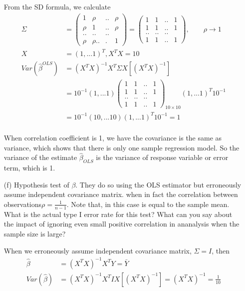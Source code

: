 \documentclass[11pt]{article} %
\begin{document}
\begin{itemize}
From the SD formula, we calculate 
\begin{align*}
	\Sigma &= \begin{pmatrix}
		1 & \rho &.. & \rho \\
		\rho & 1 &.. & \rho\\
		.. &.. & ..& \\
		\rho & \rho ..&. & 1 
	\end{pmatrix} = \begin{pmatrix}
	1 & 1 &.. & 1 \\
	1 & 1 &.. & 1 \\
	.. &.. & ..& \\
	1 & 1 &. .& 1 
\end{pmatrix} , \qquad \rho \rightarrow 1\\
X &= (1,...1)^T,  X^T X = 10 \\
	Var(\hat{\beta}^{OLS}) & = (X^T X)^{-1}X^T \Sigma X [(X^T X)^{-1}] \\
	&= 10^{-1} (1,...1) \begin{pmatrix}
		1 & 1 &.. & 1 \\
		1 & 1 &.. & 1 \\
		.. &.. & ..& \\
		1 & 1 &. .& 1 
	\end{pmatrix} _{10 \times 10} (1,...1)^T 10^{-1} \\
&= 10^{-1} (10,...10) (1,...1)^T 10^{-1}  = 1\\
\end{align*}

When correlation coefficient is 1, we have the covariance is the same as variance, which shows that there is only one sample regression model. So the variance of the estimate $\hat{\beta}_{OLS}$ is the variance of response variable or error term, which is 1.

\item[(f)] Hypothesis test of $\beta$. They do so using the OLS estimator but erroneously assume independent covariance matrix. when in fact the correlation between observations$\rho = \frac{1}{n-1}$. Note that, in this case is equal to the sample mean. What is the actual type I error rate for this test? What can you say about the impact of ignoring even small positive correlation in ananalysis when the sample size is large?

When we erroneously assume independent covariance matrix, $\Sigma = I$, then 
\begin{align*}
	\hat{\beta}  &=  (X^T X)^{-1}X^T Y = \bar{Y}\\
	Var(\hat{\beta} ) &= (X^T X)^{-1}X^T I X [(X^T X)^{-1}] = (X^T X)^{-1} = \frac{1}{10}
\end{align*}


\end{itemize}
\end{document}
